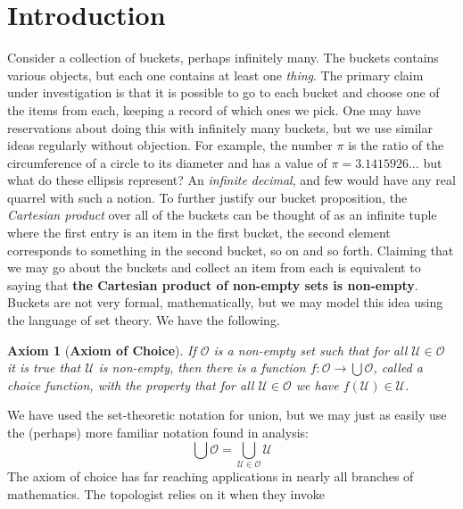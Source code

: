 \documentclass{article}
\newtheorem{axiom}{Axiom}[section]
\theoremstyle{definition}
\begin{document}
    \section{Introduction}
        Consider a collection of buckets, perhaps infinitely many. The buckets
        contains various objects, but each one contains at least one
        \textit{thing}. The primary claim under investigation is that it is
        possible to go to each bucket and choose one of the items from
        each, keeping a record of which ones we pick. One may have reservations
        about doing this with infinitely many buckets, but we use similar ideas
        regularly without objection. For example, the number $\pi$ is the
        ratio of the circumference of a circle to its diameter and has a
        value of $\pi=3.1415926\dots$ but what do these ellipsis represent?
        An \textit{infinite decimal}, and few would have any real quarrel
        with such a notion. To further justify our bucket proposition,
        the \textit{Cartesian product} over all of the buckets can be thought
        of as an infinite tuple where the first entry is an item in the
        first bucket, the second element corresponds to something in the
        second bucket, so on and so forth. Claiming that we may go about the
        buckets and collect an item from each is equivalent to saying that
        \textbf{the Cartesian product of non-empty sets is non-empty}. Buckets
        are not very formal, mathematically, but we may model this idea using
        the language of set theory. We have the following.
        \begin{axiom}[\textbf{Axiom of Choice}]
            If $\mathcal{O}$ is a non-empty set such that for all
            $\mathcal{U}\in\mathcal{O}$ it is true that $\mathcal{U}$ is
            non-empty, then there is a function
            $f:\mathcal{O}\rightarrow\bigcup\mathcal{O}$, called a
            \textit{choice function}, with the property that for all
            $\mathcal{U}\in\mathcal{O}$ we have $f(\mathcal{U})\in\mathcal{U}$.
        \end{axiom}
        We have used the set-theoretic notation for union, but we may just as
        easily use the (perhaps) more familiar notation found in analysis:
        \begin{equation}
            \bigcup\mathcal{O}
            =\bigcup_{\mathcal{U}\in\mathcal{O}}\mathcal{U}
        \end{equation}
        The axiom of choice has far reaching applications in nearly all
        branches of mathematics. The topologist relies on it when they invoke
\end{document}
